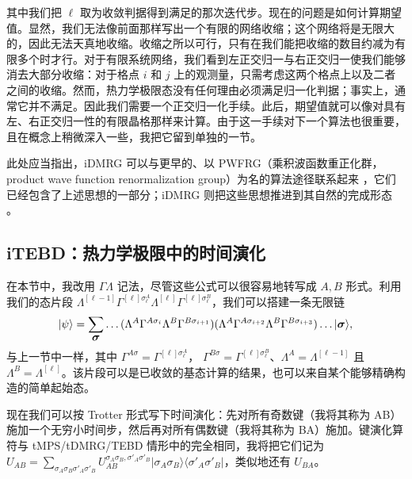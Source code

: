 \documentclass[a4paper,10pt,oneside,onecolumn,1p,times]{elsarticle}
\newcommand{\bra}[1]{\mbox{$\langle #1  |$}}
\newcommand{\ket}[1]{\mbox{$| #1  \rangle$}}
\newcommand{\fat}[1]{\mbox{\boldmath$#1$\unboldmath}}	%
\begin{document}
其中我们把 $\ell$ 取为收敛判据得到满足的那次迭代步。现在的问题是如何计算期望值。显然，我们无法像前面那样写出一个有限的网络收缩；这个网络将是无限大的，因此无法天真地收缩。收缩之所以可行，只有在我们能把收缩的数目约减为有限多个时才行。对于有限系统网络，我们看到左正交归一与右正交归一使我们能够消去大部分收缩：对于格点 $i$ 和 $j$ 上的观测量，只需考虑这两个格点上以及二者之间的收缩。然而，热力学极限态没有任何理由必须满足归一化判据；事实上，通常它并不满足。因此我们需要一个正交归一化手续。此后，期望值就可以像对具有左、右正交归一性的有限晶格那样来计算。由于这一手续对下一个算法也很重要，且在概念上稍微深入一些，我把它留到单独的一节。 

此处应当指出，iDMRG 可以与更早的、以 PWFRG（乘积波函数重正化群，product wave function renormalization group）为名的算法途径联系起来 \cite{NishinoOkunishi95,Hieida97,Ueda06}，它们已经包含了上述思想的一部分；iDMRG 则把这些思想推进到其自然的完成形态 \cite{Ueda08,Ueda10}。

\subsection{iTEBD：热力学极限中的时间演化}
在本节中，我改用 $\Gamma\Lambda$ 记法，尽管这些公式可以很容易地转写成 $A,B$ 形式。利用我们的态片段 $\Lambda^{[\ell-1]} \Gamma^{[\ell]\sigma_\ell^A} \Lambda^{[\ell]} \Gamma^{[\ell]\sigma_\ell^B}$，我们可以搭建一条无限链
\begin{equation}
\ket{\psi} = \sum_{\fat{\sigma}} \ldots (\Lambda^A \Gamma^{A \sigma_i} \Lambda^B \Gamma^{B \sigma_{i+1}})(\Lambda^A \Gamma^{A \sigma_{i+2}} \Lambda^B \Gamma^{B \sigma_{i+3}}) \ldots \ket{\fat{\sigma}} ,
\end{equation}
与上一节中一样，其中 $\Gamma^{A\sigma}= \Gamma^{[\ell]\sigma_\ell^A}$，
$\Gamma^{B\sigma}= \Gamma^{[\ell]\sigma_\ell^B}$、$\Lambda^A=\Lambda^{[\ell-1]}$ 且
$\Lambda^B=\Lambda^{[\ell]}$。该片段可以是已收敛的基态计算的结果，也可以来自某个能够精确构造的简单起始态。

现在我们可以按 Trotter 形式写下时间演化：先对所有奇数键（我将其称为 AB）施加一个无穷小时间步，然后再对所有偶数键（我将其称为 BA）施加。键演化算符与 tMPS/tDMRG/TEBD 情形中的完全相同，我将把它们记为 $U_{AB} = \sum_{\sigma_A\sigma_B\sigma'_A\sigma'_B} U_{AB}^ {\sigma_A\sigma_B, \sigma'_A\sigma'_B} \ket{\sigma_A\sigma_B} \bra{\sigma'_A\sigma'_B}$，类似地还有 $U_{BA}$。
\end{document}
